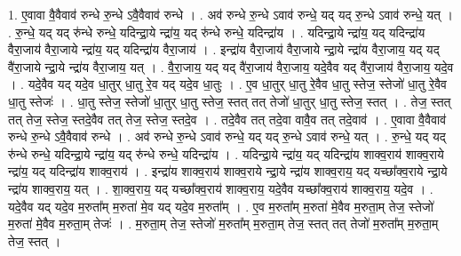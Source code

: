 \documentclass[17pt]{extarticle}
\begin{document}
1. ए॒वावा वै॒वैवाव॑ रुन्धे रु॒न्धे ऽवै॒वैवाव॑ रुन्धे । . अव॑ रुन्धे रु॒न्धे ऽवाव॑ रुन्धे॒ यद् यद् रु॒न्धे ऽवाव॑ रुन्धे॒ यत् । . रु॒न्धे॒ यद् यद् रु॑न्धे रुन्धे॒ यदिन्द्रा॒ये न्द्रा॑य॒ यद् रु॑न्धे रुन्धे॒ यदिन्द्रा॑य । . यदिन्द्रा॒ये न्द्रा॑य॒ यद् यदिन्द्रा॑य वैरा॒जाय॑ वैरा॒जाये न्द्रा॑य॒ यद् यदिन्द्रा॑य वैरा॒जाय॑ । . इन्द्रा॑य वैरा॒जाय॑ वैरा॒जाये न्द्रा॒ये न्द्रा॑य वैरा॒जाय॒ यद् यद् वै॑रा॒जाये न्द्रा॒ये न्द्रा॑य वैरा॒जाय॒ यत् । . वै॒रा॒जाय॒ यद् यद् वै॑रा॒जाय॑ वैरा॒जाय॒ यदे॒वैव यद् वै॑रा॒जाय॑ वैरा॒जाय॒ यदे॒व । . यदे॒वैव यद् यदे॒व धा॒तुर् धा॒तु रे॒व यद् यदे॒व धा॒तुः । . ए॒व धा॒तुर् धा॒तु रे॒वैव धा॒तु स्तेज॒ स्तेजो॑ धा॒तु रे॒वैव धा॒तु स्तेजः॑ । . धा॒तु स्तेज॒ स्तेजो॑ धा॒तुर् धा॒तु स्तेज॒ स्तत् तत् तेजो॑ धा॒तुर् धा॒तु स्तेज॒ स्तत् । . तेज॒ स्तत् तत् तेज॒ स्तेज॒ स्तदे॒वैव तत् तेज॒ स्तेज॒ स्तदे॒व । . तदे॒वैव तत् तदे॒वा वावै॒व तत् तदे॒वाव॑ । . ए॒वावा वै॒वैवाव॑ रुन्धे रु॒न्धे ऽवै॒वैवाव॑ रुन्धे । . अव॑ रुन्धे रु॒न्धे ऽवाव॑ रुन्धे॒ यद् यद् रु॒न्धे ऽवाव॑ रुन्धे॒ यत् । . रु॒न्धे॒ यद् यद् रु॑न्धे रुन्धे॒ यदिन्द्रा॒ये न्द्रा॑य॒ यद् रु॑न्धे रुन्धे॒ यदिन्द्रा॑य । . यदिन्द्रा॒ये न्द्रा॑य॒ यद् यदिन्द्रा॑य शाक्व॒राय॑ शाक्व॒राये न्द्रा॑य॒ यद् यदिन्द्रा॑य शाक्व॒राय॑ । . इन्द्रा॑य शाक्व॒राय॑ शाक्व॒राये न्द्रा॒ये न्द्रा॑य शाक्व॒राय॒ यद् यच्छा᳚क्व॒राये न्द्रा॒ये न्द्रा॑य शाक्व॒राय॒ यत् । . शा॒क्व॒राय॒ यद् यच्छा᳚क्व॒राय॑ शाक्व॒राय॒ यदे॒वैव यच्छा᳚क्व॒राय॑ शाक्व॒राय॒ यदे॒व । . यदे॒वैव यद् यदे॒व म॒रुता᳚म् म॒रुता॑ मे॒व यद् यदे॒व म॒रुता᳚म् । . ए॒व म॒रुता᳚म् म॒रुता॑ मे॒वैव म॒रुता॒म् तेज॒ स्तेजो॑ म॒रुता॑ मे॒वैव म॒रुता॒म् तेजः॑ । . म॒रुता॒म् तेज॒ स्तेजो॑ म॒रुता᳚म् म॒रुता॒म् तेज॒ स्तत् तत् तेजो॑ म॒रुता᳚म् म॒रुता॒म् तेज॒ स्तत् । \newline
\end{document}
